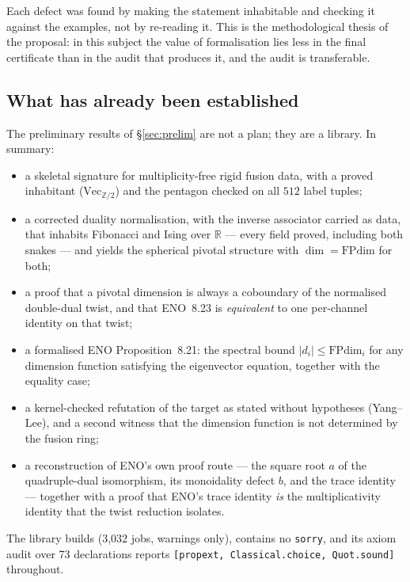 \documentclass[11pt,a4paper]{article}
\theoremstyle{remark}
\newcommand{\FPdim}{\mathrm{FPdim}}
\newcommand{\Vect}{\mathrm{Vec}}
\newcommand{\R}{\mathbb{R}}
\newcommand{\Z}{\mathbb{Z}}
\begin{document}
Each defect was found by making the statement inhabitable and checking it against the examples,
not by re-reading it. This is the methodological thesis of the proposal: in this subject the
value of formalisation lies less in the final certificate than in the audit that produces it,
and the audit is transferable.

\subsection{What has already been established}\label{sec:whatdone}

The preliminary results of \S\ref{sec:prelim} are not a plan; they are a library. In summary:

\begin{itemize}
\item a skeletal signature for multiplicity-free rigid fusion data, with a proved inhabitant
($\Vect_{\Z/2}$) and the pentagon checked on all $512$ label tuples;
\item a corrected duality normalisation, with the inverse associator carried as data, that
inhabits Fibonacci and Ising over $\R$ --- every field proved, including both snakes --- and
yields the spherical pivotal structure with $\dim = \FPdim$ for both;
\item a proof that a pivotal dimension is always a coboundary of the normalised double-dual
twist, and that ENO~8.23 is \emph{equivalent} to one per-channel identity on that twist;
\item a formalised ENO Proposition~8.21: the spectral bound $|d_i| \le \FPdim_i$ for any
dimension function satisfying the eigenvector equation, together with the equality case;
\item a kernel-checked refutation of the target as stated without hypotheses (Yang--Lee), and a
second witness that the dimension function is not determined by the fusion ring;
\item a reconstruction of ENO's own proof route --- the square root $a$ of the quadruple-dual
isomorphism, its monoidality defect $b$, and the trace identity --- together with a proof that
ENO's trace identity \emph{is} the multiplicativity identity that the twist reduction isolates.
\end{itemize}

The library builds (3{,}032 jobs, warnings only), contains no \texttt{sorry}, and its axiom
audit over 73 declarations reports \texttt{[propext, Classical.choice, Quot.sound]} throughout.
\end{document}
